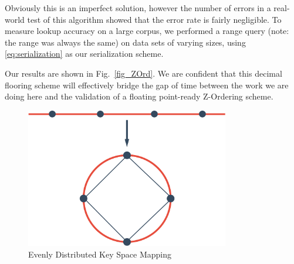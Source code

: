 \documentclass[10pt]{IEEEtran}
\newcommand*\Let[2]{\State #1 $\gets$ #2}
\newcommand*\Append[2]{\State #1$.append($#2$)$}
\begin{document}
\par Obviously this is an imperfect solution, however the number of errors in a real-world test of this algorithm showed that the error rate is fairly negligible. To measure lookup accuracy on a large corpus, we performed a range query (note: the range was always the same) on data sets of varying sizes, using \ref{eq:serialization} as our serialization scheme.
        

\par Our results are shown in Fig.~\ref{fig_ZOrd}. We are confident that this decimal flooring scheme will effectively bridge the gap of time between the work we are doing here and the validation of a floating point-ready Z-Ordering scheme.

\begin{figure}[!t]
\centering
\includegraphics[width=3.5in]{finalRing}
\caption{Evenly Distributed Key Space Mapping}
\label{fig_kSpace}
\end{figure}
\end{document}
